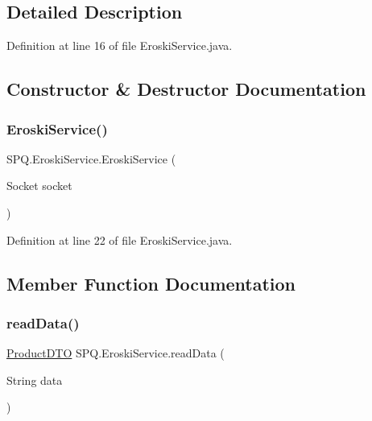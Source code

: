 \subsection{Detailed Description}


Definition at line 16 of file Eroski\+Service.\+java.



\subsection{Constructor \& Destructor Documentation}
\mbox{\label{class_s_p_q_1_1_eroski_service_a89b9137c5a6ba87692037a4b0bc2b14e}} 
\subsubsection{\texorpdfstring{Eroski\+Service()}{EroskiService()}}
{\footnotesize\ttfamily S\+P\+Q.\+Eroski\+Service.\+Eroski\+Service (\begin{DoxyParamCaption}\item[{Socket}]{socket }\end{DoxyParamCaption})}



Definition at line 22 of file Eroski\+Service.\+java.



\subsection{Member Function Documentation}
\mbox{\label{class_s_p_q_1_1_eroski_service_a89fa3f97cdca647e3c6d6606e5dc2443}} 
\subsubsection{\texorpdfstring{read\+Data()}{readData()}}
{\footnotesize\ttfamily \mbox{\hyperlink{class_s_p_q_1_1dto_1_1_product_d_t_o}{Product\+D\+TO}} S\+P\+Q.\+Eroski\+Service.\+read\+Data (\begin{DoxyParamCaption}\item[{String}]{data }\end{DoxyParamCaption})}



